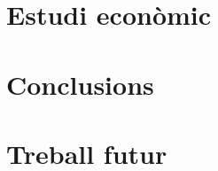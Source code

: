 \documentclass[a4paper,12pt]{article}
\begin{document}
\clearpage \section{Estudi econòmic} %


% 

\clearpage \section{Conclusions}


\clearpage \section{Treball futur}




\newpage
\medskip
\nocite{*}




\end{document}
